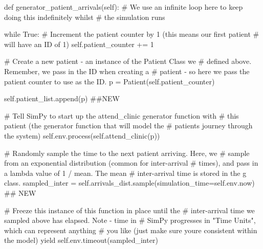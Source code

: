 \documentclass[
  letterpaper,
  DIV=11,
  numbers=noendperiod]{scrreprt}
\newenvironment{Shaded}{\begin{snugshade}}{\end{snugshade}}
\newcommand{\CommentTok}[1]{\textcolor[rgb]{0.37,0.37,0.37}{#1}}
\newcommand{\ControlFlowTok}[1]{\textcolor[rgb]{0.00,0.23,0.31}{#1}}
\newcommand{\DecValTok}[1]{\textcolor[rgb]{0.68,0.00,0.00}{#1}}
\newcommand{\KeywordTok}[1]{\textcolor[rgb]{0.00,0.23,0.31}{#1}}
\newcommand{\NormalTok}[1]{\textcolor[rgb]{0.00,0.23,0.31}{#1}}
\newcommand{\OperatorTok}[1]{\textcolor[rgb]{0.37,0.37,0.37}{#1}}
\newcommand{\VariableTok}[1]{\textcolor[rgb]{0.07,0.07,0.07}{#1}}
\begin{document}
\begin{Shaded}
\begin{Highlighting}[]
    \KeywordTok{def}\NormalTok{ generator\_patient\_arrivals(}\VariableTok{self}\NormalTok{):}
        \CommentTok{\# We use an infinite loop here to keep doing this indefinitely whilst}
        \CommentTok{\# the simulation runs}

        \ControlFlowTok{while} \VariableTok{True}\NormalTok{:}
            \CommentTok{\# Increment the patient counter by 1 (this means our first patient}
            \CommentTok{\# will have an ID of 1)}
            \VariableTok{self}\NormalTok{.patient\_counter }\OperatorTok{+=} \DecValTok{1}

            \CommentTok{\# Create a new patient {-} an instance of the Patient Class we}
            \CommentTok{\# defined above.  Remember, we pass in the ID when creating a}
            \CommentTok{\# patient {-} so here we pass the patient counter to use as the ID.}
\NormalTok{            p }\OperatorTok{=}\NormalTok{ Patient(}\VariableTok{self}\NormalTok{.patient\_counter)}

            \VariableTok{self}\NormalTok{.patient\_list.append(p) }\CommentTok{\#\#NEW}

            \CommentTok{\# Tell SimPy to start up the attend\_clinic generator function with}
            \CommentTok{\# this patient (the generator function that will model the}
            \CommentTok{\# patient\textquotesingle{}s journey through the system)}
            \VariableTok{self}\NormalTok{.env.process(}\VariableTok{self}\NormalTok{.attend\_clinic(p))}

            \CommentTok{\# Randomly sample the time to the next patient arriving.  Here, we}
            \CommentTok{\# sample from an exponential distribution (common for inter{-}arrival}
            \CommentTok{\# times), and pass in a lambda value of 1 / mean.  The mean}
            \CommentTok{\# inter{-}arrival time is stored in the g class.}
\NormalTok{            sampled\_inter }\OperatorTok{=} \VariableTok{self}\NormalTok{.arrivals\_dist.sample(simulation\_time}\OperatorTok{=}\VariableTok{self}\NormalTok{.env.now) }\CommentTok{\#\# NEW}

            \CommentTok{\# Freeze this instance of this function in place until the}
            \CommentTok{\# inter{-}arrival time we sampled above has elapsed.  Note {-} time in}
            \CommentTok{\# SimPy progresses in "Time Units", which can represent anything}
            \CommentTok{\# you like (just make sure you\textquotesingle{}re consistent within the model)}
            \ControlFlowTok{yield} \VariableTok{self}\NormalTok{.env.timeout(sampled\_inter)}
\end{Highlighting}
\end{Shaded}
\end{document}

